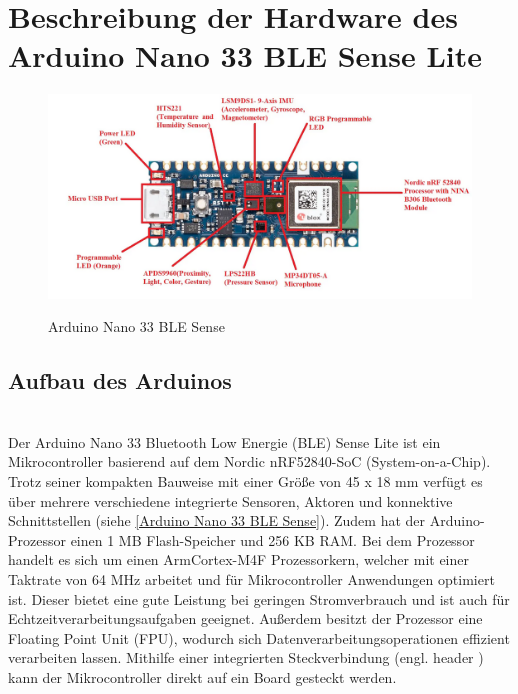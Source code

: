 
\chapter{Beschreibung der Hardware des Arduino Nano 33 BLE Sense Lite}
\begin{figure}[htb]
	\begin{center}
		
		\includegraphics[width=\textwidth]{General/ArduinoBoard.png}
		\caption{Arduino Nano 33 BLE Sense}\cite{eTech.2021} \label{Arduino Nano 33 BLE Sense}
	\end{center}
\end{figure}
\section{Aufbau des Arduinos}
\cite{Ard}
\\
Der Arduino Nano 33 Bluetooth Low Energie (BLE) Sense Lite ist ein Mikrocontroller basierend auf dem Nordic nRF52840-SoC (System-on-a-Chip). Trotz seiner kompakten Bauweise mit einer Größe von 45 x 18 mm verfügt es über mehrere verschiedene integrierte Sensoren, Aktoren und konnektive Schnittstellen (siehe \autoref{Arduino Nano 33 BLE Sense}). Zudem hat der Arduino-Prozessor einen 1 MB Flash-Speicher und 256 KB RAM. Bei dem Prozessor handelt es sich um einen Arm\textregistered Cortex-M4F Prozessorkern, welcher mit einer Taktrate von 64 MHz arbeitet und für Mikrocontroller Anwendungen optimiert ist. Dieser bietet eine gute Leistung bei geringen Stromverbrauch und ist auch für Echtzeitverarbeitungsaufgaben geeignet. Außerdem besitzt der Prozessor eine Floating Point Unit (FPU), wodurch sich Datenverarbeitungsoperationen effizient verarbeiten lassen.\cite{Arm}
Mithilfe einer integrierten Steckverbindung (engl. \glqq header \grqq) kann der Mikrocontroller direkt auf ein Board gesteckt werden. 

